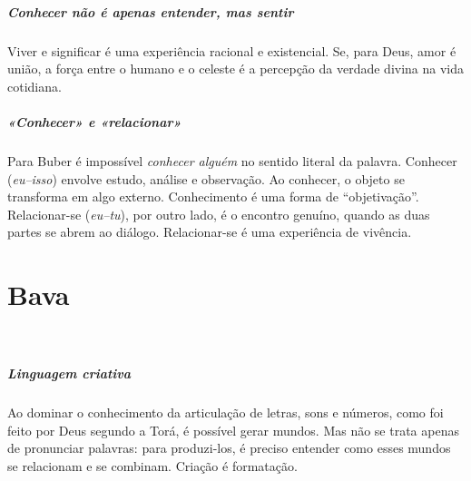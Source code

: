 \paragraph{Conhecer não é apenas entender, mas sentir} Viver e significar é uma experiência racional e existencial. Se, para Deus, amor é união, a força entre o humano e o celeste é a percepção da verdade divina na vida cotidiana.

\paragraph{«Conhecer» e «relacionar»} Para Buber é impossível \textit{conhecer alguém} no sentido literal da palavra. Conhecer (\textit{eu--isso}) envolve estudo, análise e observação. Ao conhecer, o objeto se transforma em algo externo. Conhecimento é uma forma de ``objetivação''. Relacionar-se (\textit{eu--tu}), por outro lado, é o encontro genuíno, quando as duas partes se abrem ao diálogo. Relacionar-se é uma experiência de vivência.

\chapter*{Bava 
\smallskip{}}

\begin{center}
{\huge{}}\\\medskip{\footnotesize\formularlight{
\lipsum[2]
}}
\end{center}


\paragraph{Linguagem criativa} Ao dominar o conhecimento da articulação de letras, sons e números, como foi feito por Deus segundo a Torá, é possível gerar mundos. Mas não se trata apenas de pronunciar palavras: para produzi-los, é preciso entender como esses mundos se relacionam e se combinam. Criação é formatação.

